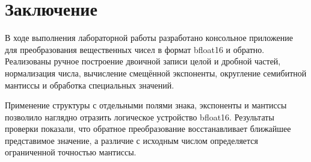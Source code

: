 \section*{Заключение}

В ходе выполнения лабораторной работы разработано консольное приложение для
преобразования вещественных чисел в формат bfloat16 и обратно. Реализованы ручное
построение двоичной записи целой и дробной частей, нормализация числа, вычисление
смещённой экспоненты, округление семибитной мантиссы и обработка специальных
значений.

Применение структуры с отдельными полями знака, экспоненты и мантиссы позволило
наглядно отразить логическое устройство bfloat16. Результаты проверки показали,
что обратное преобразование восстанавливает ближайшее представимое значение, а
различие с исходным числом определяется ограниченной точностью мантиссы.

\newpage
